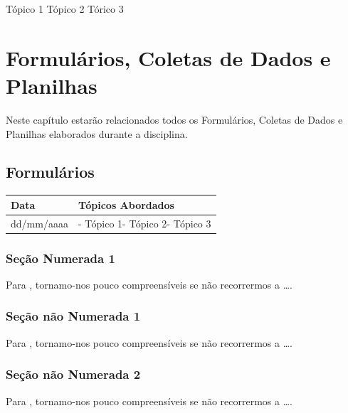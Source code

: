 \documentclass[
]{book}
\begin{document}
Tópico 1
Tópico 2
Tórico 3

\hypertarget{formuluxe1rios-coletas-de-dados-e-planilhas}{%
\chapter{Formulários, Coletas de Dados e Planilhas}\label{formuluxe1rios-coletas-de-dados-e-planilhas}}

Neste capítulo estarão relacionados todos os Formulários, Coletas de Dados e Planilhas elaborados durante a disciplina.

\hypertarget{formuluxe1rios}{%
\section{Formulários}\label{formuluxe1rios}}

\begin{longtable}[]{@{}ll@{}}
\toprule()
Data & Tópicos Abordados \\
\midrule()
\endhead
dd/mm/aaaa & - Tópico 1- Tópico 2- Tópico 3 \\
\bottomrule()
\end{longtable}

\hypertarget{seuxe7uxe3o-numerada-1-12}{%
\subsection{Seção Numerada 1}\label{seuxe7uxe3o-numerada-1-12}}

Para \citet{BOCK2001}, tornamo-nos pouco compreensíveis se não recorrermos a \ldots.

\hypertarget{seuxe7uxe3o-nuxe3o-numerada-1-24}{%
\subsection*{Seção não Numerada 1}\label{seuxe7uxe3o-nuxe3o-numerada-1-24}}

Para \citet{BOCK2001}, tornamo-nos pouco compreensíveis se não recorrermos a \ldots.

\hypertarget{seuxe7uxe3o-nuxe3o-numerada-2-36}{%
\subsection*{Seção não Numerada 2}\label{seuxe7uxe3o-nuxe3o-numerada-2-36}}

Para \citet{BOCK2001}, tornamo-nos pouco compreensíveis se não recorrermos a \ldots.
\end{document}
